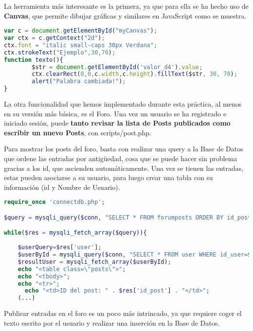 \documentclass[12pt]{report}
\begin{document}
La herramienta más interesante es la primera, ya que para ella se ha hecho uso de \textbf{Canvas}, que permite dibujar gráficas y similares en JavaScript como se muestra.

\begin{figure}[h]
    \qquad
    \label{fig:example}%
\end{figure}

\begin{lstlisting}[language=JavaScript]
var c = document.getElementById("myCanvas");
var ctx = c.getContext("2d");
ctx.font = "italic small-caps 30px Verdana";
ctx.strokeText("Ejemplo",30,70);
function texto(){
        $str = document.getElementById('valor_d4').value;
        ctx.clearRect(0,0,c.width,c.height).fillText($str, 30, 70);
        alert("Palabra cambiada!");
}
\end{lstlisting}

La otra funcionalidad que hemos implementado durante esta práctica, al menos en su versión más básica, es el Foro. Una vez un usuario se ha registrado e iniciado sesión, puede \textbf{tanto revisar la lista de Posts publicados como escribir un nuevo Posts}, con scripts/post.php.

Para mostrar los posts del foro, basta con realizar una query a la Base de Datos que ordene las entradas por antigüedad, cosa que se puede hacer sin problema gracias a los id, que ascienden automáticamente. Una vez se tienen las entradas, estas pueden asociarse a su usuario, para luego crear una tabla con su información (id y Nombre de Usuario).
\newline

\begin{lstlisting}[language=PHP]
require_once 'connectdb.php';

$query = mysqli_query($conn, "SELECT * FROM forumposts ORDER BY id_post DESC");

while($res = mysqli_fetch_array($query)){
    
    $userQuery=$res['user'];
    $userById = mysqli_query($conn, "SELECT * FROM user WHERE id_user=$userQuery");  
    $resultUser = mysqli_fetch_array($userById);
    echo "<table class=\"posts\">";
    echo "<tbody>";
    echo "<tr>";
	  echo "<td>ID del post: " . $res['id_post'] . "</td>";
    (...)
\end{lstlisting}

Publicar entradas en el foro es un poco más intrincado, ya que requiere coger el texto escrito por el usuario y realizar una inserción en la Base de Datos.
\newline
\end{document}
